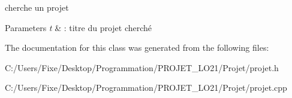 cherche un projet 


\begin{DoxyParams}{Parameters}
{\em t} & \+: titre du projet cherché \\
\hline
\end{DoxyParams}


The documentation for this class was generated from the following files\+:\begin{DoxyCompactItemize}
\item 
C\+:/\+Users/\+Fixe/\+Desktop/\+Programmation/\+P\+R\+O\+J\+E\+T\+\_\+\+L\+O21/\+Projet/projet.\+h\item 
C\+:/\+Users/\+Fixe/\+Desktop/\+Programmation/\+P\+R\+O\+J\+E\+T\+\_\+\+L\+O21/\+Projet/projet.\+cpp\end{DoxyCompactItemize}
